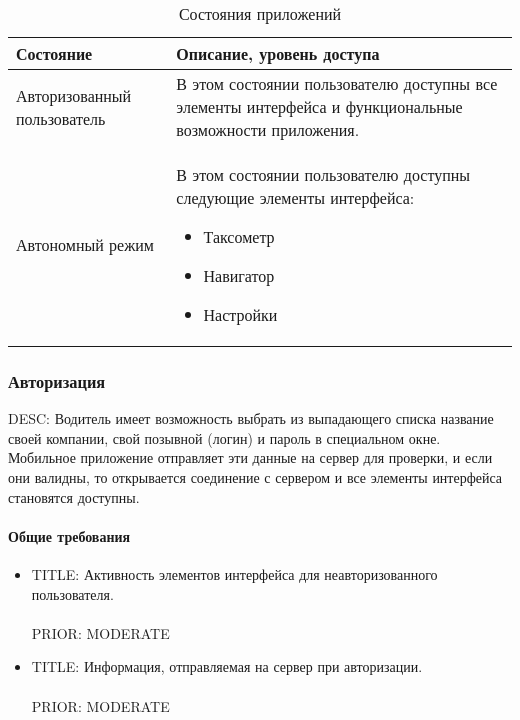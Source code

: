              \begin{table}
             \begin{center}
             \caption {Состояния приложений}
             \label{app_state}
             \setlength{\extrarowheight}{2mm}
             \begin{tabular}{|p{5cm}|p{10cm}|}
                 \hline     \textbf{Состояние}&\textbf{Описание, уровень доступа} \\ [2mm]

                 \hline   Авторизованный пользователь & В этом состоянии пользователю доступны все элементы интерфейса и функциональные возможности приложения.\\ [2mm]
                 \hline   Автономный режим & В этом состоянии пользователю доступны следующие элементы интерфейса: \begin{itemize} \item Таксометр \item Навигатор \item Настройки \end{itemize}\\ [2mm]
                  \hline
             \end{tabular}
             \end{center}
             \end{table}

  	  \subsubsection{Авторизация}

  		  DESC: Водитель имеет возможность выбрать из выпадающего списка название своей компании, свой позывной (логин) и пароль в специальном окне. Мобильное приложение отправляет эти данные на сервер для проверки, и если они валидны, то открывается соединение с сервером и все элементы интерфейса становятся доступны.

        \paragraph{Общие требования}
          \begin{itemize}
            \item{
              TITLE: Активность элементов интерфейса для неавторизованного пользователя.\\
              \\
              PRIOR: MODERATE\\}

            \item{
              TITLE: Информация, отправляемая на сервер при авторизации.\\
              \\
              PRIOR: MODERATE\\}
          \end{itemize}  		    


